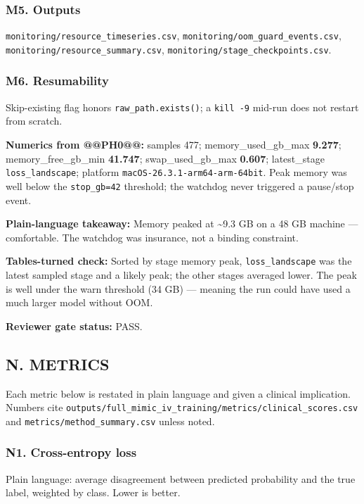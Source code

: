 \documentclass{article}
\begin{document}
\subsubsection{M5. Outputs}


\texttt{monitoring/resource\_timeseries.csv}, \texttt{monitoring/oom\_guard\_events.csv}, \texttt{monitoring/resource\_summary.csv}, \texttt{monitoring/stage\_checkpoints.csv}.


\subsubsection{M6. Resumability}


Skip-existing flag honors \texttt{raw\_path.exists()}; a \texttt{kill -9} mid-run does not restart from scratch.


\textbf{Numerics from @@PH0@@:} samples 477; memory\_used\_gb\_max \textbf{9.277}; memory\_free\_gb\_min \textbf{41.747}; swap\_used\_gb\_max \textbf{0.607}; latest\_stage \texttt{loss\_landscape}; platform \texttt{macOS-26.3.1-arm64-arm-64bit}. Peak memory was well below the \texttt{stop\_gb=42} threshold; the watchdog never triggered a pause/stop event.


\textbf{Plain-language takeaway:} Memory peaked at \textasciitilde{}9.3 GB on a 48 GB machine --- comfortable. The watchdog was insurance, not a binding constraint.


\textbf{Tables-turned check:} Sorted by stage memory peak, \texttt{loss\_landscape} was the latest sampled stage and a likely peak; the other stages averaged lower. The peak is well under the warn threshold (34 GB) --- meaning the run could have used a much larger model without OOM.


\textbf{Reviewer gate status:} PASS.


\subsection{N. METRICS}


Each metric below is restated in plain language and given a clinical implication. Numbers cite \texttt{outputs/full\_mimic\_iv\_training/metrics/clinical\_scores.csv} and \texttt{metrics/method\_summary.csv} unless noted.


\subsubsection{N1. Cross-entropy loss}


Plain language: average disagreement between predicted probability and the true label, weighted by class. Lower is better.
\end{document}
